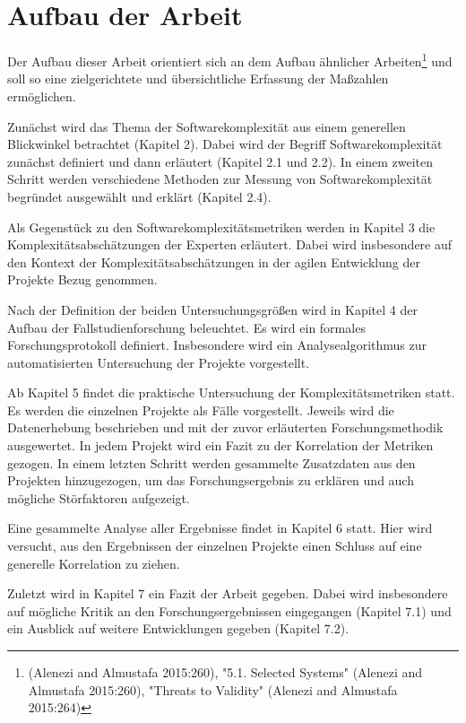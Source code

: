 \section{Aufbau der Arbeit}\label{aufbau-der-arbeit}

Der Aufbau dieser Arbeit orientiert sich an dem Aufbau ähnlicher
Arbeiten\footnote{(Alenezi and Almustafa 2015:260), "5.1. Selected
  Systems" (Alenezi and Almustafa 2015:260), "Threats to Validity"
  (Alenezi and Almustafa 2015:264)} und soll so eine zielgerichtete und
übersichtliche Erfassung der Maßzahlen ermöglichen.

Zunächst wird das Thema der Softwarekomplexität aus einem generellen
Blickwinkel betrachtet (Kapitel 2). Dabei wird der Begriff
Softwarekomplexität zunächst definiert und dann erläutert (Kapitel 2.1
und 2.2). In einem zweiten Schritt werden verschiedene Methoden zur
Messung von Softwarekomplexität begründet ausgewählt und erklärt
(Kapitel 2.4).

Als Gegenstück zu den Softwarekomplexitätsmetriken werden in Kapitel 3
die Komplexitätsabschätzungen der Experten erläutert. Dabei wird
insbesondere auf den Kontext der Komplexitätsabschätzungen in der agilen
Entwicklung der Projekte Bezug genommen.

Nach der Definition der beiden Untersuchungsgrößen wird in Kapitel 4 der
Aufbau der Fallstudienforschung beleuchtet. Es wird ein formales
Forschungsprotokoll definiert. Insbesondere wird ein Analysealgorithmus
zur automatisierten Untersuchung der Projekte vorgestellt.

Ab Kapitel 5 findet die praktische Untersuchung der Komplexitätsmetriken
statt. Es werden die einzelnen Projekte als Fälle vorgestellt. Jeweils
wird die Datenerhebung beschrieben und mit der zuvor erläuterten
Forschungsmethodik ausgewertet. In jedem Projekt wird ein Fazit zu der
Korrelation der Metriken gezogen. In einem letzten Schritt werden
gesammelte Zusatzdaten aus den Projekten hinzugezogen, um das
Forschungsergebnis zu erklären und auch mögliche Störfaktoren
aufgezeigt.

Eine gesammelte Analyse aller Ergebnisse findet in Kapitel 6 statt. Hier
wird versucht, aus den Ergebnissen der einzelnen Projekte einen Schluss
auf eine generelle Korrelation zu ziehen.

Zuletzt wird in Kapitel 7 ein Fazit der Arbeit gegeben. Dabei wird
insbesondere auf mögliche Kritik an den Forschungsergebnissen
eingegangen (Kapitel 7.1) und ein Ausblick auf weitere Entwicklungen
gegeben (Kapitel 7.2).